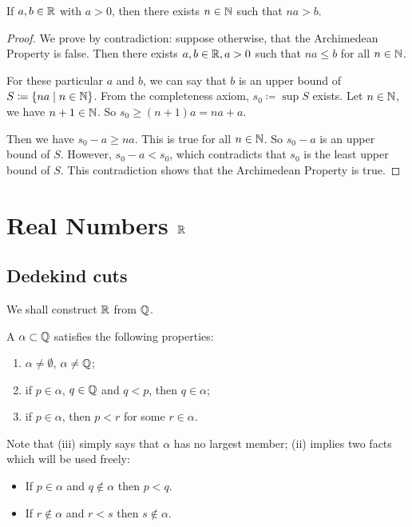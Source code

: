 \begin{theorem}
If $a,b \in \mathbb R$ with $a>0$, then there exists $n \in \mathbb N$ such that $na>b$.
\end{theorem}
\begin{proof}
We prove by contradiction: suppose otherwise, that the Archimedean Property is false. Then there exists $a, b \in \mathbb R, a > 0$ such that $na \le b$ for all $n \in \mathbb N$.

For these particular $a$ and $b$, we can say that $b$ is an upper bound of $S \coloneqq \{na \mid n \in \mathbb N\}$. From the completeness axiom, $s_0 \coloneqq \sup S$ exists. Let $n \in \mathbb N$, we have $n+1 \in \mathbb N$. So $s_0 \ge (n+1)a = na+a$.

Then we have $s_0-a \ge na$. This is true for all $n \in \mathbb N$. So $s_0-a$ is an upper bound of $S$. However, $s_0-a<s_0$, which contradicts that $s_0$ is the least upper bound of $S$. This contradiction shows that the Archimedean Property is true.
\end{proof}
\pagebreak



\section{Real Numbers $\mathbb R$}
\subsection{Dedekind cuts}
We shall construct $\mathbb R$ from $\mathbb Q$.

\begin{definition}
A  $\alpha\subset\mathbb Q$ satisfies the following properties:
\begin{enumerate}[label=(\roman*)]
\item $\alpha\neq\emptyset$, $\alpha\neq\mathbb Q$;
\item if $p\in\alpha$, $q\in\mathbb Q$ and $q<p$, then $q\in\alpha$;
\item if $p\in\alpha$, then $p<r$ for some $r\in\alpha$.
\end{enumerate}
\end{definition}

Note that (iii) simply says that $\alpha$ has no largest member; (ii) implies two facts which will be used freely:
\begin{itemize}
\item If $p\in\alpha$ and $q\notin\alpha$ then $p<q$.
\item If $r\notin\alpha$ and $r<s$ then $s\notin\alpha$.
\end{itemize}

